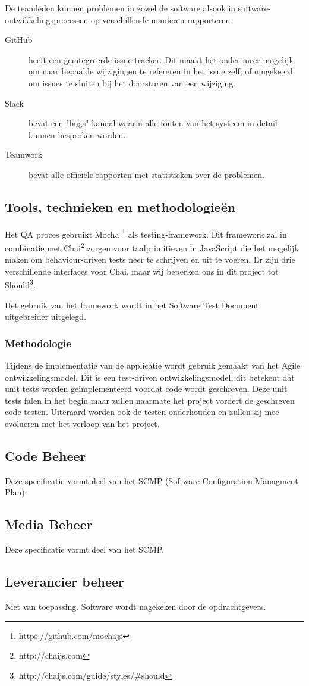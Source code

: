 De teamleden kunnen problemen in zowel de software alsook in software-ontwikkelingsprocessen op verschillende manieren rapporteren.
\begin{description}
\item[GitHub] heeft een geïntegreerde issue-tracker. Dit maakt het onder meer mogelijk om naar bepaalde wijzigingen te refereren in het issue zelf, of omgekeerd om issues te sluiten bij het doorsturen van een wijziging.
\item[Slack] bevat een "bugs" kanaal waarin alle fouten van het systeem in detail kunnen besproken worden.
\item[Teamwork] bevat alle officiële rapporten met statistieken over de problemen.
\end{description}

\subsection{Tools, technieken en methodologieën}

Het QA proces gebruikt Mocha \footnote{\url{https://github.com/mochajs}} als testing-framework. Dit framework zal in combinatie met Chai\footnote{http://chaijs.com} zorgen voor taalprimitieven in JavaScript die het mogelijk maken om behaviour-driven tests neer te schrijven en uit te voeren. Er zijn drie verschillende interfaces voor Chai, maar wij beperken ons in dit project tot Should\footnote{http://chaijs.com/guide/styles/\#should}.\newline

Het gebruik van het framework wordt in het Software Test Document uitgebreider uitgelegd.


\subsubsection{Methodologie}

Tijdens de implementatie van de applicatie wordt gebruik gemaakt van het Agile ontwikkelingsmodel. Dit is een test-driven ontwikkelingsmodel, dit betekent dat unit tests worden geimplementeerd voordat code wordt geschreven. Deze unit tests falen in het begin maar zullen naarmate het project vordert de geschreven code testen. Uiteraard worden ook de testen onderhouden en zullen zij mee evolueren met het verloop van het project.


\subsection{Code Beheer}

Deze specificatie vormt deel van het SCMP (Software Configuration Managment Plan).

\subsection{Media Beheer}

Deze specificatie vormt deel van het SCMP.

\subsection{Leverancier beheer}

Niet van toepassing. Software wordt nagekeken door de opdrachtgevers.